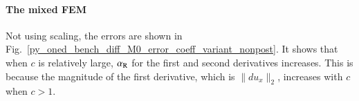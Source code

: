 \documentclass[review,3p]{elsarticle}
\begin{document}
% 
% 
% 
% 

\paragraph{The mixed FEM}
Not using scaling, the errors are shown in Fig.~\ref{py_oned_bench_diff_M0_error_coeff_variant_nonpost}.
It shows that when $c$ is relatively large, $\alpha_{\rm R}$ for the first and second derivatives increases. This is because the magnitude of the first derivative, which is $\|du_x\|_2$, increases with $c$ when $c>1$.
\end{document}

